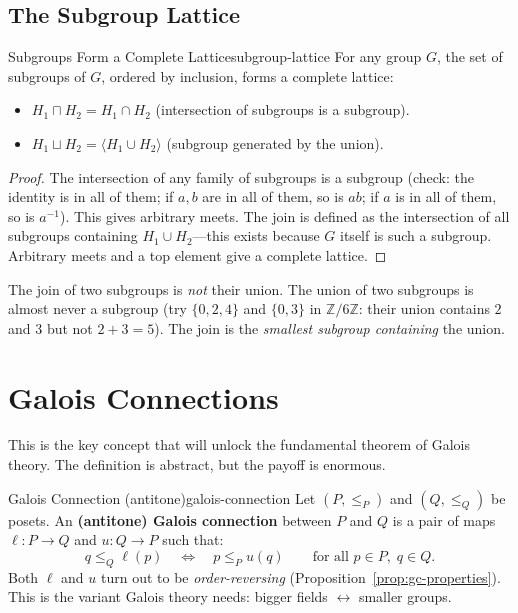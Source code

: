 \documentclass[11pt, a4paper, oneside]{book}
\newcommand{\Z}{\mathbb{Z}}
\begin{document}
\subsection{The Subgroup Lattice}

\begin{thm}{Subgroups Form a Complete Lattice}{subgroup-lattice}
For any group $G$, the set of subgroups of $G$, ordered by inclusion, forms
a complete lattice:
\begin{itemize}[nosep]
\item $H_1 \sqcap H_2 = H_1 \cap H_2$ (intersection of subgroups is a subgroup).
\item $H_1 \sqcup H_2 = \langle H_1 \cup H_2 \rangle$ (subgroup generated by the union).
\end{itemize}
\end{thm}

\begin{proof}
The intersection of any family of subgroups is a subgroup (check: the identity
is in all of them; if $a, b$ are in all of them, so is $ab$; if $a$ is in all
of them, so is $a^{-1}$). This gives arbitrary meets. The join is defined as
the intersection of all subgroups containing $H_1 \cup H_2$---this exists
because $G$ itself is such a subgroup. Arbitrary meets and a top element give
a complete lattice.
\end{proof}

\begin{warning}
The join of two subgroups is \emph{not} their union. The union of two subgroups
is almost never a subgroup (try $\{0, 2, 4\}$ and $\{0, 3\}$ in $\Z/6\Z$:
their union contains $2$ and $3$ but not $2 + 3 = 5$). The join is the
\emph{smallest subgroup containing} the union.
\end{warning}

\section{Galois Connections}

This is the key concept that will unlock the fundamental theorem of Galois
theory. The definition is abstract, but the payoff is enormous.

\begin{defn}{Galois Connection (antitone)}{galois-connection}
Let $(P, \leq_P)$ and $(Q, \leq_Q)$ be posets. An \textbf{(antitone) Galois
connection} between $P$ and $Q$ is a pair of maps
$\ell : P \to Q$ and $u : Q \to P$ such that:
\[
  q \leq_Q \ell(p) \quad \iff \quad p \leq_P u(q)
  \qquad \text{for all } p \in P, \; q \in Q.
\]
Both $\ell$ and $u$ turn out to be \emph{order-reversing}
(Proposition~\ref{prop:gc-properties}). This is the variant Galois theory
needs: bigger fields $\leftrightarrow$ smaller groups.
\end{defn}
\end{document}
